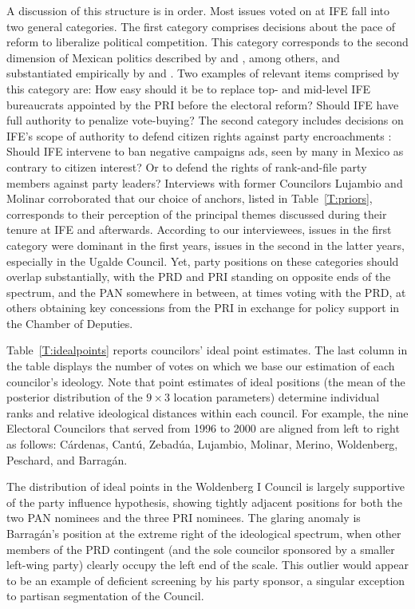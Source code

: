 \documentclass[12 pt, letter]{article}
\begin{document}
A discussion of this structure is in order. Most issues voted on at
IFE fall into two general categories. The first category comprises
decisions about the pace of reform to liberalize political
competition. This category corresponds to the second dimension of
Mexican politics described by \citet{Molinar1991} and
\citet{Lujambio2001}, among others, and substantiated empirically by
\citet{Moreno2003a} and \citet{Magaloni2006}.  Two examples of
relevant items comprised by this category are: How easy should it be
to replace top- and mid-level IFE bureaucrats appointed by the PRI
before the electoral reform? Should IFE have full authority to
penalize vote-buying?  The second category includes decisions on
IFE's scope of authority to defend citizen rights against party
encroachments \citep[cf.][]{Cardenas2004}: Should IFE intervene to
ban negative campaigns ads, seen by many in Mexico as contrary to
citizen interest? Or to defend the rights of rank-and-file party
members against party leaders? Interviews with former Councilors
Lujambio and Molinar corroborated that our choice of anchors, listed
in Table~\ref{T:priors}, corresponds  to their perception of the
principal themes discussed during their tenure at IFE and
afterwards.  According to our interviewees, issues in the first
category were dominant in the first years, issues in the second in
the latter years, especially in the Ugalde Council. Yet, party
positions on these  categories should overlap substantially, with
the PRD and PRI standing on opposite ends of the spectrum, and the
PAN somewhere in between, at times voting with the PRD, at others
obtaining key concessions from the PRI in exchange for policy
support in the Chamber of Deputies.

Table~\ref{T:idealpoints} reports councilors' ideal point estimates.
The last column in the table displays the number of votes on which
we base our estimation of each councilor's ideology. Note that point
estimates of ideal positions (the mean of the posterior distribution
of the $9 \times 3$ location parameters) determine individual ranks
and relative ideological distances within each council.  For
example, the nine Electoral Councilors that served from 1996 to 2000
are aligned from left to right as follows: C\'ardenas, Cant\'u,
Zebad\'ua, Lujambio, Molinar, Merino, Woldenberg, Peschard, and
Barrag\'an.

The distribution of ideal points in the Woldenberg I Council is
largely supportive of the party influence hypothesis, showing
tightly adjacent positions for both the two PAN nominees and the
three PRI nominees.  The glaring anomaly is Barrag\'an's position at
the extreme right of the ideological spectrum, when other members of
the PRD contingent (and the sole councilor sponsored by a smaller
left-wing party) clearly occupy the left end of the scale.  This
outlier would appear to be an example of deficient screening by his
party sponsor, a singular exception to partisan segmentation of the
Council.
\end{document}
